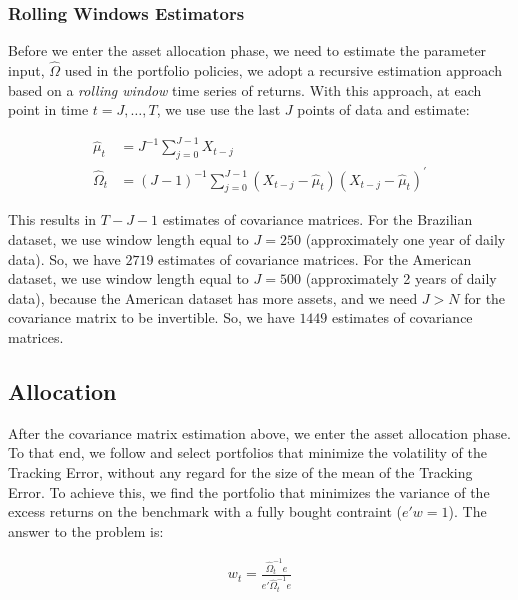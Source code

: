 \documentclass[12pt,oneside,a4paper]{memoir}
\begin{document}
\subsubsection*{Rolling Windows Estimators}
Before we enter the asset allocation phase, we need to estimate the parameter input, $\hat{\Omega}$ used in the portfolio policies, we adopt a recursive estimation approach based on a \textit{rolling window} time series of returns.
With this approach, at each point in time $t=J, \dots, T$, we use use the last $J$ points of data and estimate:

\vspace{-18 pt}
\begin{align*}
	\hat{\mu}_{t} &=
	J^{-1} \sum^{J-1}_{j=0} X_{t-j}
	\\
	\hat{\Omega}_{t} &=
	(J-1)^{-1} \sum^{J-1}_{j=0}
	(X_{t-j} - \hat{\mu}_{t})(X_{t-j} - \hat{\mu}_{t})^{\prime}
\end{align*}

This results in $T-J-1$ estimates of covariance matrices.
For the Brazilian dataset, we use window length equal to $J=250$ (approximately one year of daily data).
So, we have $2719$ estimates of covariance matrices.
% 
For the American dataset, we use window length equal to $J=500$ (approximately 2 years of daily data), because the American dataset has more assets, and we need $J>N$ for the covariance matrix to be invertible.
So, we have $1449$ estimates of covariance matrices.

\subsection{Allocation}
After the covariance matrix estimation above, we enter the asset allocation phase.
To that end, we follow  and select portfolios that minimize the volatility of the Tracking Error, without any regard for the size of the mean of the Tracking Error.
To achieve this, we find the portfolio that minimizes the variance of the excess returns on the benchmark with a fully bought contraint ($e'w=1$).
The answer to the problem is:


\vspace{-18 pt}
\begin{align} \label{eq:gmv}
w_{t} = \frac{\hat{\Omega}_{t}^{-1}e}{e'\hat{\Omega}_{t}^{-1}e}
\end{align}
\end{document}
